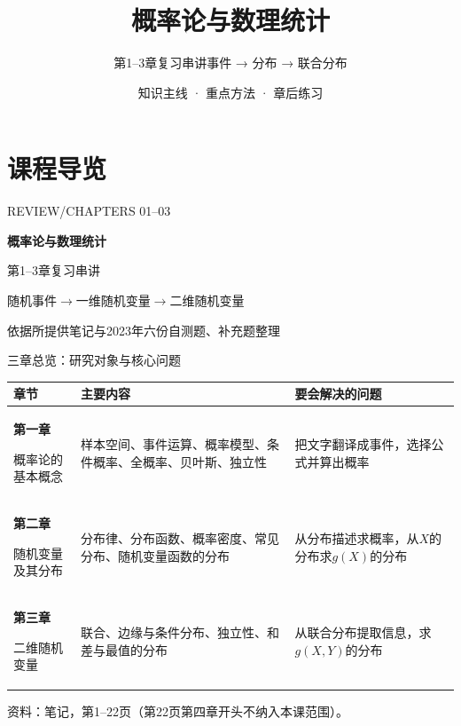 \documentclass[aspectratio=169,10pt]{beamer}
\title{概率论与数理统计}
\subtitle{第1--3章复习串讲\quad 事件 → 分布 → 联合分布}
\author{知识主线 · 重点方法 · 章后练习}
\date{}
\newcommand{\source}[1]{\vfill{\color{Muted}\fontsize{6.5}{8}\selectfont 资料：#1\par}}
\begin{document}
\section{课程导览}

\begin{frame}[plain]
\vspace{6mm}
{\color{Teal}\small REVIEW\quad /\quad CHAPTERS 01--03}\par
\vspace{4mm}
{\color{Navy}\LARGE\bfseries 概率论与数理统计}\par
\vspace{3mm}
{\color{Navy}\Large 第1--3章复习串讲}\par
\vspace{5mm}
{\large 随机事件\quad$\longrightarrow$\quad 一维随机变量\quad$\longrightarrow$\quad 二维随机变量}
\vspace{5mm}
\vfill
{\color{Muted}\small 依据所提供笔记与2023年六份自测题、补充题整理}
\end{frame}

\begin{frame}[t]{三章总览：研究对象与核心问题}
\renewcommand{\arraystretch}{1.5}
\begin{tabular}{p{2.6cm}p{5.1cm}p{5.3cm}}
\toprule
\textbf{章节} & \textbf{主要内容} & \textbf{要会解决的问题}\\\midrule
\textbf{第一章}\par 概率论的基本概念 & 样本空间、事件运算、概率模型、条件概率、全概率、贝叶斯、独立性 & 把文字翻译成事件，选择公式并算出概率\\
\textbf{第二章}\par 随机变量及其分布 & 分布律、分布函数、概率密度、常见分布、随机变量函数的分布 & 从分布描述求概率，从$X$的分布求$g(X)$的分布\\
\textbf{第三章}\par 二维随机变量 & 联合、边缘与条件分布、独立性、和差与最值的分布 & 从联合分布提取信息，求$g(X,Y)$的分布\\\bottomrule
\end{tabular}
\source{笔记，第1--22页（第22页第四章开头不纳入本课范围）。}
\end{frame}
\end{document}
